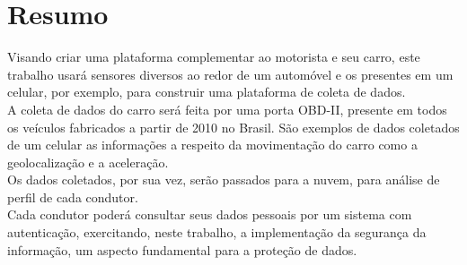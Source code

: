 \chapter*{Resumo}

\noindent Visando criar uma plataforma complementar ao motorista e seu carro, este trabalho usará sensores diversos ao redor de um automóvel e os presentes em um celular, por exemplo, para construir uma plataforma de coleta de dados.\\
A coleta de dados do carro será feita por uma porta OBD-II, presente em todos os veículos fabricados a partir de 2010 no Brasil. São exemplos de dados coletados de um celular as informações a respeito da movimentação do carro como a geolocalização e a aceleração.\\ 
Os dados coletados, por sua vez, serão passados para a nuvem, para análise de perfil de cada condutor.\\ 
Cada condutor poderá consultar seus dados pessoais por um sistema com autenticação, exercitando, neste trabalho, a implementação da segurança da informação, um aspecto fundamental para a proteção de dados.
